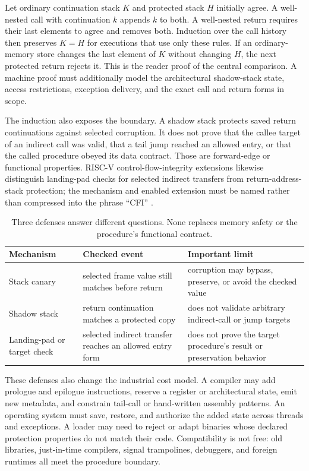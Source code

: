 Let ordinary continuation stack \(K\) and protected stack \(H\) initially
agree. A well-nested call with continuation \(k\) appends \(k\) to both. A
well-nested return requires their last elements to agree and removes both.
Induction over the call history then preserves \(K=H\) for executions that use
only these rules. If an ordinary-memory store changes the last element of
\(K\) without changing \(H\), the next protected return rejects it. This is
the reader proof of the central comparison. A machine proof must additionally
model the architectural shadow-stack state, access restrictions, exception
delivery, and the exact call and return forms in scope.

The induction also exposes the boundary. A shadow stack protects saved return
continuations against selected corruption. It does not prove that the callee
target of an indirect call was valid, that a tail jump reached an allowed
entry, or that the called procedure obeyed its data contract. Those are
forward-edge or functional properties. RISC-V control-flow-integrity
extensions likewise distinguish landing-pad checks for selected indirect
transfers from return-address-stack protection; the mechanism and enabled
extension must be named rather than compressed into the phrase ``CFI''
\autocite{riscv2026cfi}.

\begin{table}[htbp]
\centering
\caption{Three defenses answer different questions. None replaces memory
safety or the procedure's functional contract.}
\begin{tabular}{p{}p{}p{}}
\toprule
Mechanism & Checked event & Important limit \\
\midrule
Stack canary & selected frame value still matches before return & corruption may bypass, preserve, or avoid the checked value \\
Shadow stack & return continuation matches a protected copy & does not validate arbitrary indirect-call or jump targets \\
Landing-pad or target check & selected indirect transfer reaches an allowed entry form & does not prove the target procedure's result or preservation behavior \\
\bottomrule
\end{tabular}
\end{table}

These defenses also change the industrial cost model. A compiler may add
prologue and epilogue instructions, reserve a register or architectural state,
emit new metadata, and constrain tail-call or hand-written assembly patterns.
An operating system must save, restore, and authorize the added state across
threads and exceptions. A loader may need to reject or adapt binaries whose
declared protection properties do not match their code. Compatibility is not
free: old libraries, just-in-time compilers, signal trampolines, debuggers, and
foreign runtimes all meet the procedure boundary.

